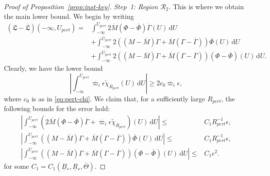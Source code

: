 \documentclass[10pt, reqno]{amsart}
\theoremstyle{definition}
\theoremstyle{remark}
\theoremstyle{conjecture}
\numberwithin{equation}{section}
\newcommand{\ud}{\mathrm{d}}
\newcommand{\0}{\emptyset}
\newcommand{\Gmm}{\Gamma}
\newcommand{\eps}{\epsilon}
\newcommand{\Tht}{\Theta}
\newcommand{\calR}{\mathcal R}
\newcommand{\pfstep}[1]{\vspace{.5em} {\it \noindent #1.}}
\newcommand{\varpibg}{\overline{\varpi}}				%
\newcommand{\Phibg}{\overline{\Phi}}				%
\newcommand{\Abs}[1]{\left\vert #1 \right\vert}
\begin{document}
\begin{proof}[Proof of Proposition~\ref{prop:inst-key}]
\pfstep{Step~1: Region $\calR_{2}$}
This is where we obtain the main lower bound. We begin by writing
\begin{align*}
	(\mathfrak{L} - \overline{\mathfrak{L}})(-\infty, U_{pert})
	= & \int_{-\infty}^{U_{pert}} 2 \overline{M} (\Phi - \Phibg) \overline{\Gmm}(U)\, \ud U \\
	& + \int_{-\infty}^{U_{pert}}  2 ( (M - \overline{M}) \Gmm + \overline{M} (\Gmm - \overline{\Gmm}) ) \Phibg (U)\, \ud U \\
	& + \int_{-\infty}^{U_{pert}} 2 ( (M - \overline{M}) \Gmm + \overline{M} (\Gmm - \overline{\Gmm}) ) (\Phi - \Phibg) (U)\, \ud U .
\end{align*}
Clearly, we have the lower bound
\begin{equation} \label{eq:inst-key:R2-main} 
\Abs{\int_{-\infty}^{U_{pert}} \varpibg_{i} \eps \tilde{\chi}_{R_{pert}} (U)\, \ud U} \geq 2 c_{0} \varpibg_{i} \eps,
\end{equation}
where $c_{0}$ is as in \eqref{eq:pert-chi}. We claim that, for a sufficiently large $R_{pert}$, the following bounds for the error hold:
\begin{align}
\Abs{\int_{-\infty}^{U_{pert}} \left( 2 \overline{M} (\Phi - \Phibg) \overline{\Gmm} + \varpibg_{i} \eps \tilde{\chi}_{R_{pert}} \right) (U) \, \ud U} \leq & C_{1} R_{pert}^{-1} \eps, \label{eq:inst-key:R2-0} \\
\Abs{\int_{-\infty}^{U_{pert}}   ( (M - \overline{M}) \Gmm + \overline{M} (\Gmm - \overline{\Gmm})) \Phibg (U)\, \ud U} \leq & C_{1} R_{pert}^{-1} \eps, \label{eq:inst-key:R2-1} \\
\Abs{\int_{-\infty}^{U_{pert}}   ( (M - \overline{M}) \Gmm + \overline{M} (\Gmm - \overline{\Gmm})) (\Phi - \Phibg) (U)\, \ud U} \leq & C_{1} \eps^{2}. \label{eq:inst-key:R2-2}
\end{align}
for some $C_{1} = C_{1}(\underline{B}_{\ast},\underline{R}_*, \overline{\Tht})$. 


\end{proof}
\end{document}

